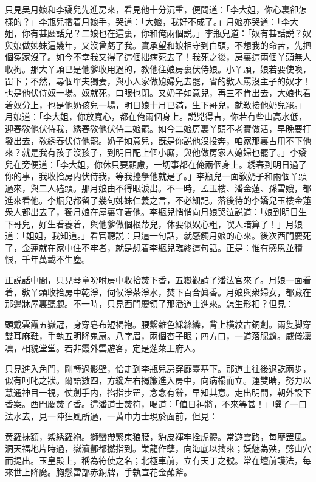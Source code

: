 只見吴月娘和李嬌兒先進房來，看見他十分沉重，便問道：「李大姐，你心裏卻怎樣的？」李瓶兒揝着月娘手，哭道：「大娘，我好不成了。」月娘亦哭道：「李大姐，你有甚麽話兒？二娘也在這裏，你和俺兩個説。」李瓶兒道：「奴有甚話説？奴與娘做姊妹這幾年，又沒曾虧了我。實承望和娘相守到白頭，不想我的命苦，先把個寃家沒了。如今不幸我又得了這個拙病死去了！我死之後，房裏這兩個丫頭無人收拘。那大丫頭已是他爹收用過的，教他往娘房裏伏侍娘。小丫頭，娘若要使喚，㽞下；不然，尋個單夫獨妻，與小人家做媳婦兒去罷，省的敎人罵沒主子的奴才！也是他伏侍奴一場。奴就死，口眼也閉。又奶子如意兒，再三不肯出去，大娘也看着奴分上，也是他奶孩兒一場，明日娘十月已滿，生下哥兒，就敎接他奶兒罷。」月娘道：「李大姐，你放寬心，都在俺兩個身上。説兇得吉，你若有些山高水低，迎春敎他伏侍我，綉春敎他伏侍二娘罷。如今二娘房裏丫頭不老實做活，早晚要打發出去，敎綉春伏侍他罷。奶子如意兒，旣是你説他沒投奔，咱家那裏占用不下他來？就是我有孩子沒孩子，到明日配上個小廝，與他做房家人媳婦也罷了。」李嬌兒在旁便道：「李大姐，你休只要顧慮，一切事都在俺兩個身上。綉春到明日過了你的事，我收拾房内伏侍我，等我擡擧他就是了。」李瓶兒一面敎奶子和兩個丫頭過來，與二人磕頭。那月娘由不得眼淚出。不一時，孟玉樓、潘金蓮、孫雪娥，都進來看他。李瓶兒都留了幾句姊妹仁義之言，不必細記。落後待的李嬌兒玉樓金蓮衆人都出去了，獨月娘在屋裏守着他。李瓶兒悄悄向月娘哭泣説道：「娘到明日生下哥兒，好生看養着，與他爹做個根蒂兒，休要似奴心粗，喫人暗算了！」月娘道：「姐姐，我知道。」看官聽説：只這一句話，就感觸月娘的心來。後次西門慶死了，金蓮就在家中住不牢者，就是想着李瓶兒臨終這句話。正是：惟有感恩並積恨，千年萬載不生塵。

正説話中間，只見琴童吩咐房中收拾焚下香，五嶽觀請了潘法官來了。月娘一面看着，敎丫頭收拾房中乾淨，伺候淨茶淨水，焚下百合眞香。月娘與衆婦女，都藏在那邊牀屋裏聽覷。不一時，只見西門慶領了那潘道士進來。怎生形相？但見：

\begin{myquote}
頭戴雲霞五嶽冠，身穿皂布短褐袍。腰繫雜色綵絲縧，背上横紋古銅劍。兩隻脚穿雙耳麻鞋，手執五明降鬼扇。八字眉，兩個杏子眼；四方口，一道落腮鬍。威儀凜凜，相貌堂堂。若非霞外雲遊客，定是蓬萊王府人。
\end{myquote}

只見進入角門，剛轉過影壁，恰走到李瓶兒房穿廊臺基下。那道士往後退訖兩步，似有呵叱之狀。爾語數四，方纔左右揭簾進入房中，向病榻而立。運雙睛，努力以慧通神目一視，仗劍手内，掐指步罡，念念有辭，早知其意。走出明間，朝外設下香案。西門慶焚了香。這潘道士焚符，喝道：「值日神將，不來等甚！」噀了一口法水去，見一陣狂風所過，一黄巾力士現於面前，但見：

\begin{myquote}
黄羅抹額，紫綉羅袍。獅蠻帶緊束狼腰，豹皮褌牢拴虎體。常遊雲路，每歷罡風。洞天福地片時過，嶽瀆酆都撚指到。業龍作孽，向海底以擒來；妖魅為殃，劈山穴而提出。玉皇殿上，稱為符使之名；北極車前，立有天丁之號。常在壇前護法，每來世上降魔。胸懸雷部赤銅牌，手執宣花金蘸斧。
\end{myquote}

